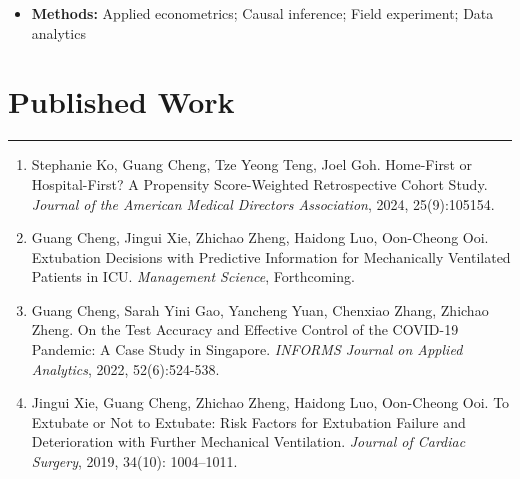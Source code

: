 \documentclass[12pt, a4paper]{article}
\begin{document}
{\begin{itemize}[leftmargin=14pt, itemsep=6pt, parsep=0.2pt, topsep=1pt]
	\item[] \textbf{Methods:} Applied econometrics; Causal inference; Field experiment; Data analytics
	
\end{itemize}




\section*{Published Work}
\vspace*{0.4em}
\hrule height 0.5pt

\begin{enumerate}[leftmargin=28pt, itemsep=6pt, parsep=0.2pt, topsep=1pt]

	\item Stephanie Ko, Guang Cheng, Tze Yeong Teng, Joel Goh. 
	Home-First or Hospital-First? A Propensity Score-Weighted Retrospective Cohort Study.
	{\it Journal of the American Medical Directors Association}, 2024, 25(9):105154.
	
	\item Guang Cheng, Jingui Xie, Zhichao Zheng, Haidong Luo, Oon-Cheong Ooi.
	Extubation Decisions with Predictive Information for Mechanically Ventilated Patients in ICU.
	{\it Management Science}, Forthcoming.

	\item Guang Cheng, Sarah Yini Gao, Yancheng Yuan, Chenxiao Zhang, Zhichao Zheng. 
	On the Test Accuracy and Effective Control of the COVID-19 Pandemic: A Case Study in Singapore. 
	{\it INFORMS Journal on Applied Analytics}, 2022, 52(6):524-538.

	\item Jingui Xie, Guang Cheng, Zhichao Zheng, Haidong Luo, Oon-Cheong Ooi. 
	To Extubate or Not to Extubate: Risk Factors for Extubation Failure and Deterioration with Further Mechanical Ventilation. 
	{\it Journal of Cardiac Surgery}, 2019, 34(10): 1004–1011.

\end{enumerate}




}
\end{document}
